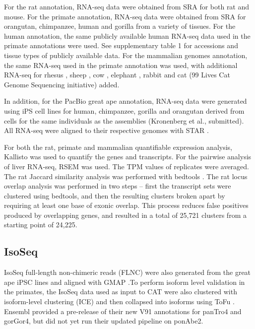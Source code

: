 \documentclass[fleqn,10pt]{wlscirep}
\begin{document}
For the rat annotation, RNA-seq data were obtained from SRA for both rat and mouse. For the primate annotation, RNA-seq data were obtained from SRA for orangutan, chimpanzee, human and gorilla from a variety of tissues. For the human annotation, the same publicly available human RNA-seq data used in the primate annotations were used. See supplementary table 1 for accessions and tissue types of publicly available data. For the mammalian genomes annotation, the same RNA-seq used in the primate annotation was used, with additional RNA-seq for rhesus \cite{ruiz2015origins}, sheep \cite{rojas2015transcriptional}, cow \cite{fang2017integrating}, elephant \cite{cortez2014origins}, rabbit \cite{fushan2015gene} and cat (99 Lives Cat Genome Sequencing initiative) added.

In addition, for the PacBio great ape annotation, RNA-seq data were generated using iPS cell lines for human, chimpanzee, gorilla and orangutan derived from cells for the same individuals as the assemblies (Kronenberg et al., submitted). All RNA-seq were aligned to their respective genomes with STAR \cite{dobin2013star}.

For both the rat, primate and mammalian quantifiable expression analysis, Kallisto \cite{bray2015near} was used to quantify the genes and transcripts. For the pairwise analysis of liver RNA-seq, RSEM \cite{li2011rsem} was used. The TPM values of replicates were averaged. The rat Jaccard similarity analysis was performed with bedtools \cite{quinlan2010bedtools}. The rat locus overlap analysis was performed in two steps -- first the transcript sets were clustered using bedtools, and then the resulting clusters broken apart by requiring at least one base of exonic overlap. This process reduces false positives produced by overlapping genes, and resulted in a total of 25,721 clusters from a starting point of 24,225.

\subsection*{IsoSeq}
IsoSeq full-length non-chimeric reads (FLNC) were also generated from the great ape iPSC lines and aligned with GMAP \cite{wu2005gmap}.To perform isoform level validation in the primates, the IsoSeq data used as input to CAT were also clustered with isoform-level clustering (ICE) and then collapsed into isoforms using ToFu \cite{gordon2015widespread}. Ensembl provided a pre-release of their new V91 annotations for panTro4 and gorGor4, but did not yet run their updated pipeline on ponAbe2.
\end{document}
